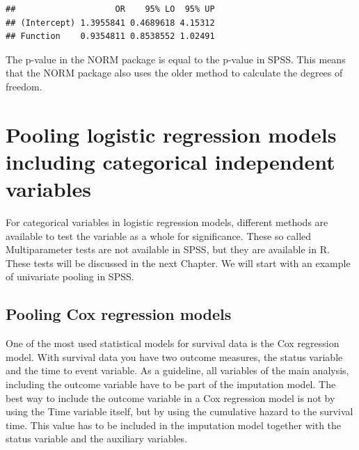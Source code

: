 \documentclass[]{book}
\newenvironment{Shaded}{\begin{snugshade}}{\end{snugshade}}
\newcommand{\KeywordTok}[1]{\textcolor[rgb]{0.13,0.29,0.53}{\textbf{#1}}}
\newcommand{\DecValTok}[1]{\textcolor[rgb]{0.00,0.00,0.81}{#1}}
\newcommand{\StringTok}[1]{\textcolor[rgb]{0.31,0.60,0.02}{#1}}
\newcommand{\OperatorTok}[1]{\textcolor[rgb]{0.81,0.36,0.00}{\textbf{#1}}}
\newcommand{\NormalTok}[1]{#1}
\theoremstyle{definition}
\theoremstyle{definition}
\theoremstyle{definition}
\theoremstyle{remark}
\begin{document}
\begin{Shaded}
\end{Shaded}

\begin{verbatim}
##                    OR    95% LO  95% UP
## (Intercept) 1.3955841 0.4689618 4.15312
## Function    0.9354811 0.8538552 1.02491
\end{verbatim}

The p-value in the NORM package is equal to the p-value in SPSS. This
means that the NORM package also uses the older method to calculate the
degrees of freedom.

\section{Pooling logistic regression models including categorical
independent
variables}\label{pooling-logistic-regression-models-including-categorical-independent-variables}

For categorical variables in logistic regression models, different
methods are available to test the variable as a whole for significance.
These so called Multiparameter tests are not available in SPSS, but they
are available in R. These tests will be discussed in the next Chapter.
We will start with an example of univariate pooling in SPSS.

\subsection{Pooling Cox regression
models}\label{pooling-cox-regression-models}

One of the most used statistical models for survival data is the Cox
regression model. With survival data you have two outcome measures, the
status variable and the time to event variable. As a guideline, all
variables of the main analysis, including the outcome variable have to
be part of the imputation model. The best way to include the outcome
variable in a Cox regression model is not by using the Time variable
itself, but by using the cumulative hazard to the survival time. This
value has to be included in the imputation model together with the
status variable and the auxiliary variables.
\end{document}
